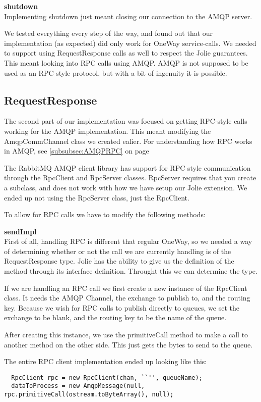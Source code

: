 \noindent\textbf{shutdown}\\
Implementing shutdown just meant closing our connection to the AMQP server.

We tested everything every step of the way, and found out that our implementation (as expected) did only work for OneWay service-calls. We needed to support using RequestResponse calls as well to respect the Jolie guarantees. This meant looking into RPC calls using AMQP. AMQP is not supposed to be used as an RPC-style protocol, but with a bit of ingenuity it is possible.

\subsection{RequestResponse}
The second part of our implementation was focused on getting RPC-style calls working for the AMQP implementation. This meant modifying the AmqpCommChannel class we created ealier. For understanding how RPC works in AMQP, see \ref{subsubsec:AMQPRPC} on page \pageref{subsubsec:AMQPRPC}

The RabbitMQ AMQP client library has support for RPC style communication through the RpcClient and RpcServer classes. RpcServer requires that you create a subclass, and does not work with how we have setup our Jolie extension. We ended up not using the RpcServer class, just the RpcClient.

To allow for RPC calls we have to modify the following methods:

\noindent\textbf{sendImpl}\\
First of all, handling RPC is different that regular OneWay, so we needed a way of determining whether or not the call we are currently handling is of the RequestResponse type. Jolie has the ability to give us the definition of the method through its interface definition. Throught this we can determine the type.

If we are handling an RPC call we first create a new instance of the RpcClient class. It needs the AMQP Channel, the exchange to publish to, and the routing key. Because we wish for RPC calls to publish directly to queues, we set the exchange to be blank, and the routing key to be the name of the queue.

After creating this instance, we use the primitiveCall method to make a call to another method on the other side. This just gets the bytes to send to the queue.

The entire RPC client implementation ended up looking like this:
\begin{lstlisting}
  RpcClient rpc = new RpcClient(chan, ``'', queueName);
  dataToProcess = new AmqpMessage(null, rpc.primitiveCall(ostream.toByteArray(), null);
\end{lstlisting}

